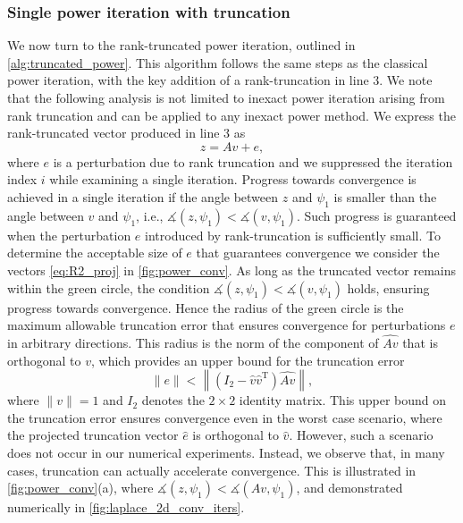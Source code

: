 \documentclass[10pt,preprint]{elsarticle}
\renewcommand{\top}{\text{T}}
\begin{document}
\subsubsection{Single power iteration with truncation} 
We now turn to the rank-truncated power iteration, outlined in \cref{alg:truncated_power}. This algorithm follows the same steps as the classical power iteration, with the key addition of a rank-truncation in line 3. We note that the following analysis is not limited to inexact power iteration arising from rank truncation and can be applied to any inexact power method. We express the rank-truncated vector produced in line 3 as 
\begin{equation} \label{eq:perturbed_power}
    z = Av + e, 
\end{equation}
where $e$ is a perturbation due to rank truncation and we suppressed the iteration index $i$ while examining a single iteration. Progress towards convergence is achieved in a single iteration if the angle between $z$ and $\psi_1$ is smaller than the angle between $v$ and $\psi_1$, i.e., $\measuredangle(z,\psi_1) < \measuredangle(v,\psi_1)$. Such progress is guaranteed when the perturbation $e$ introduced by rank-truncation is sufficiently small. 
To determine the acceptable size of $e$ that guarantees convergence we consider the vectors \eqref{eq:R2_proj} in \cref{fig:power_conv}. As long as the truncated vector remains within the green circle, the condition $\measuredangle(z,\psi_1) < \measuredangle(v,\psi_1)$ holds, ensuring progress towards convergence. Hence the radius of the green circle is the maximum allowable truncation error that ensures convergence for perturbations $e$ in arbitrary directions. This radius is the norm of the component of $\widehat{Av}$ that is orthogonal to $v$, which provides an upper bound for the truncation error 
\begin{equation} \label{eq:err_bnd1}
\|e\| < \left\|\left(I_2 - \widehat{v}\widehat{v}^{\top}\right)\widehat{Av}\right\|, 
\end{equation}
where $\|v\|=1$ and $I_2$ denotes the $2 \times 2$ identity matrix. This upper bound on the truncation error ensures convergence even in the worst case scenario, where the projected truncation vector $\widehat{e}$ is orthogonal to $\widehat{v}$. However, such a scenario does not occur in our numerical experiments. Instead, we observe that, in many cases, truncation can actually accelerate convergence. This is illustrated in \cref{fig:power_conv}(a), where $\measuredangle(z,\psi_1)<\measuredangle(Av,\psi_1)$, and demonstrated numerically in \cref{fig:laplace_2d_conv_iters}. 
\end{document}
